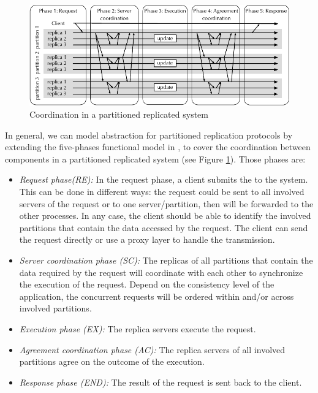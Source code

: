 \begin{figure}
  \begin{minipage}[b]{1.0\linewidth}
  \centering
        \includegraphics[width=1\linewidth]{figures/replication-coordination}
  \end{minipage}
  \caption{Coordination in a partitioned replicated system}
  \label{fig:replication:coordination}
\end{figure}

In general, we can model abstraction for partitioned replication protocols by
extending the five-phases functional model in \cite{pedone:replication}, to
cover the coordination between components in a partitioned replicated system
(see Figure \ref{fig:replication:coordination}). Those phases are:
\begin{itemize}
  \item \textit{Request phase(RE):} In the request phase, a client submits the
     to the system. This can be done in different ways: the request could
  be sent to all involved servers of the request or to one server/partition,
  then will be forwarded to the other processes. In any case, the client should
  be able to identify the involved partitions that contain the data accessed by
  the request. The client can send the request directly or use a proxy layer to
  handle the transmission.
  \item \textit{Server coordination phase (SC):} The replicas of all partitions
  that contain the data required by the request will coordinate with each other
  to synchronize the execution of the request. Depend on the consistency level
  of the application, the concurrent requests will be ordered within and/or across
  involved partitions.
  \item \textit{Execution phase (EX):} The replica servers execute the request.
  \item \textit{Agreement coordination phase (AC):} The replica servers of all involved
  partitions agree on the outcome of the execution.
  \item \textit{Response phase (END):} The result of the request is sent back to the client.
\end{itemize}

